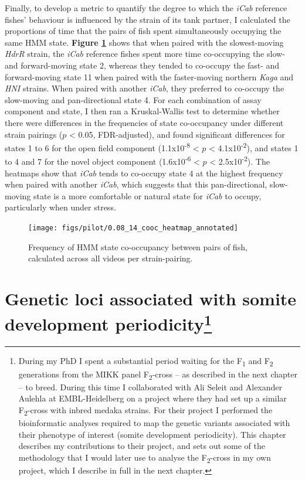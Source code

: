 \documentclass[
]{book}
\begin{document}
Finally, to develop a metric to quantify the degree to which the \emph{iCab} reference fishes' behaviour is influenced by the strain of its tank partner, I calculated the proportions of time that the pairs of fish spent simultaneously occupying the same HMM state. \textbf{Figure \ref{fig:pilot-cooc-heat}} shows that when paired with the slowest-moving \emph{HdrR} strain, the \emph{iCab} reference fishes spent more time co-occupying the slow- and forward-moving state 2, whereas they tended to co-occupy the fast- and forward-moving state 11 when paired with the faster-moving northern \emph{Kaga} and \emph{HNI} strains. When paired with another \emph{iCab}, they preferred to co-occupy the slow-moving and pan-directional state 4. For each combination of assay component and state, I then ran a Kruskal-Wallis test to determine whether there were differences in the frequencies of state co-occupancy under different strain pairings (\(p\) \textless{} 0.05, FDR-adjusted), and found significant differences for states 1 to 6 for the open field component (1.1x10\textsuperscript{-8} \textless{} \(p\) \textless{} 4.1x10\textsuperscript{-2}), and states 1 to 4 and 7 for the novel object component (1.6x10\textsuperscript{-6} \textless{} \(p\) \textless{} 2.5x10\textsuperscript{-2}). The heatmaps show that \emph{iCab} tends to co-occupy state 4 at the highest frequency when paired with another \emph{iCab}, which suggests that this pan-directional, slow-moving state is a more comfortable or natural state for \emph{iCab} to occupy, particularly when under stress.



\begin{figure}
\texttt{[image: figs/pilot/0.08\_14\_cooc\_heatmap\_annotated]} \caption{Frequency of HMM state co-occupancy between pairs of fish, calculated across all videos per strain-pairing.}\label{fig:pilot-cooc-heat}
\end{figure}

\hypertarget{Somite-chap}{%
\chapter[Genetic loci associated with somite development periodicity]{\texorpdfstring{Genetic loci associated with somite development periodicity\footnote{During my PhD I spent a substantial period waiting for the F\textsubscript{1} and F\textsubscript{2} generations from the MIKK panel F\textsubscript{2}-cross -- as described in the next chapter -- to breed. During this time I collaborated with Ali Seleit and Alexander Aulehla at EMBL-Heidelberg on a project where they had set up a similar F\textsubscript{2}-cross with inbred medaka strains. For their project I performed the bioinformatic analyses required to map the genetic variants associated with their phenotype of interest (somite development periodicity). This chapter describes my contributions to their project, and sets out some of the methodology that I would later use to analyse the F\textsubscript{2}-cross in my own project, which I describe in full in the next chapter.}}{Genetic loci associated with somite development periodicity}}\label{Somite-chap}}
\end{document}
